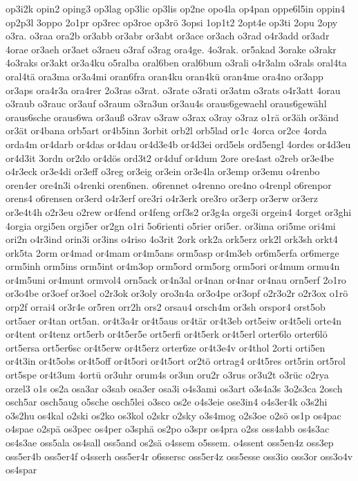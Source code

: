 {op3i2k
opin2
oping3
op3lag
op3lic
op3lis
op2ne
opo4la
op4pan
oppe6l5in
oppin4
op2p3l
3oppo
2o1pr
op3rec
op3roe
op3rö
3opsi
1op1t2
2opt4e
op3ti
2opu
2opy
o3ra.
o3raa
ora2b
or3abb
or3abr
or3abt
or3ace
or3ach
o3rad
o4r3add
or3adr
4orae
or3aeh
or3aet
o3raeu
o3raf
o3rag
ora4ge.
4o3rak.
or5akad
3orake
o3rakr
4o3raks
or3akt
or3a4ku
o5ralba
oral6ben
oral6bum
o3rali
o4r3alm
o3rals
oral4ta
oral4tä
ora3ma
or3a4mi
oran6fra
oran4ku
oran4kü
oran4me
ora4no
or3app
or3aps
ora4r3a
ora4rer
2o3ras
o3rat.
o3rate
o3rati
or3atm
o3rats
o4r3att
4orau
o3raub
o3rauc
or3auf
o3raum
o3ra3un
or3au4s
oraus6gewaehl
oraus6gewähl
oraus6sche
oraus6wa
or3auß
o3rav
o3raw
o3rax
o3ray
o3raz
o1rä
or3äh
or3änd
or3ät
or4bana
orb5art
or4b5inn
3orbit
orb2l
orb5lad
or1c
4orca
or2ce
4orda
orda4m
or4darb
or4das
or4dau
or4d3e4b
or4d3ei
ord5els
ord5engl
4ordes
or4d3eu
or4d3it
3ordn
or2do
or4dös
ord3t2
or4duf
or4dum
2ore
ore4ast
o2reb
or3e4be
o4r3eck
or3e4di
or3eff
o3reg
or3eig
or3ein
or3e4la
or3emp
or3emu
o4renbo
oren4er
ore4n3i
o4renki
oren6nen.
o6rennet
o4renno
ore4no
o4renpl
o6renpor
orens4
o6rensen
or3erd
o4r3erf
ore3ri
o4r3erk
ore3ro
or3erp
or3erw
or3erz
or3e4t4h
o2r3eu
o2rew
or4fend
or4feng
orf3s2
or3g4a
orge3i
orgein4
4orget
or3ghi
4orgia
orgi5en
orgi5er
or2gn
o1ri
5o6rienti
o5rier
ori5er.
or3ima
ori5me
ori4mi
ori2n
o4r3ind
orin3i
or3ins
o4riso
4o3rit
2ork
ork2a
ork5erz
ork2l
ork3sh
orkt4
ork5ta
2orm
or4mad
or4mam
or4m5ans
orm5asp
or4m3eb
or6m5erfa
or6merge
orm5inh
orm5ins
orm5int
or4m3op
orm5ord
orm5org
orm5ori
or4mum
ormu4n
or4m5uni
or4munt
ormvol4
orn5ack
or4n3al
or4nan
or4nar
or4nau
orn5erf
2o1ro
or3o4be
or3oef
or3oel
o2r3ok
or3oly
oro3n4a
or3o4pe
or3opf
o2r3o2r
o2r3ox
o1rö
orp2f
orrai4
or3r4e
or5ren
orr2h
ors2
orsau4
orsch4m
or3sh
orspor4
orst5ob
ort5aer
or4tan
ort5an.
or4t3a4r
or4t5aus
or4tär
or4t3eb
ort5eiw
or4t5eli
orte4n
or4tent
or4tenz
ort5erb
or4t5er5e
ort5erfi
or4t5erk
or4t5erl
orter6lo
orter6lö
ort5ersa
ort5er6sc
or4t5erw
or4t5erz
orter6ze
or4t3e4v
or4thol
2orti
orti5en
or4t3in
or4t5obs
or4t5off
or4t5ori
or4t5ort
or2tö
ortrag4
or4t5res
ort5rin
ort5rol
ort5spe
or4t3um
4ortü
or3uhr
orum4s
or3un
oru2r
o3rus
or3u2t
o3rüc
o2rya
orzel3
o1s
os2a
osa3ar
o3sab
osa3er
osa3i
o4s3ami
os3art
o3s4a3s
3o2s3ca
2osch
osch5ar
osch5aug
o5sche
osch5lei
o3sco
os2e
o4s3eie
ose3in4
o4s3er4k
o3s2hi
o3s2hu
os4kal
o2ski
os2ko
os3kol
o2skr
o2sky
o3s4mog
o2s3oe
o2sö
os1p
os4pac
o4spae
o2spä
os3pec
os4per
o3sphä
os2po
o3spr
os4pra
o2ss
oss4abb
os4s3ac
os4s3ae
oss5ala
os4sall
oss5and
os2sä
o4ssem
o5ssem.
o4ssent
oss5en4z
oss3ep
oss5er4b
oss5er4f
o4sserh
oss5er4r
o6ssersc
oss5er4z
oss5esse
oss3io
oss3or
oss3o4v
os4spar
}
